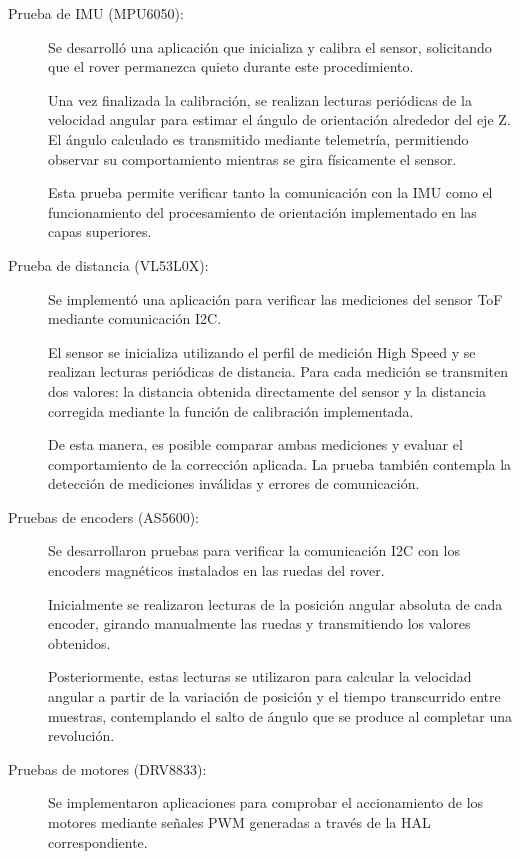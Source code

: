 \begin{description}
	
	\item[Prueba de IMU (MPU6050):]
	Se desarrolló una aplicación que inicializa y calibra el sensor, solicitando que el rover permanezca quieto durante este procedimiento.
	
	Una vez finalizada la calibración, se realizan lecturas periódicas de la velocidad angular para estimar el ángulo de orientación alrededor del eje Z. El ángulo calculado es transmitido mediante telemetría, permitiendo observar su comportamiento mientras se gira físicamente el sensor.
	
	Esta prueba permite verificar tanto la comunicación con la IMU como el funcionamiento del procesamiento de orientación implementado en las capas superiores.
	
	\item[Prueba de distancia (VL53L0X):]
	Se implementó una aplicación para verificar las mediciones del sensor ToF mediante comunicación I2C.
	
	El sensor se inicializa utilizando el perfil de medición High Speed y se realizan lecturas periódicas de distancia. Para cada medición se transmiten dos valores: la distancia obtenida directamente del sensor y la distancia corregida mediante la función de calibración implementada.
	
	De esta manera, es posible comparar ambas mediciones y evaluar el comportamiento de la corrección aplicada. La prueba también contempla la detección de mediciones inválidas y errores de comunicación.
	
	\item[Pruebas de encoders (AS5600):]
	Se desarrollaron pruebas para verificar la comunicación I2C con los encoders magnéticos instalados en las ruedas del rover.
	
	Inicialmente se realizaron lecturas de la posición angular absoluta de cada encoder, girando manualmente las ruedas y transmitiendo los valores obtenidos.
	
	Posteriormente, estas lecturas se utilizaron para calcular la velocidad angular a partir de la variación de posición y el tiempo transcurrido entre muestras, contemplando el salto de ángulo que se produce al completar una revolución.
	
	\item[Pruebas de motores (DRV8833):]
	Se implementaron aplicaciones para comprobar el accionamiento de los motores mediante señales PWM generadas a través de la HAL correspondiente.
	

\end{description}

